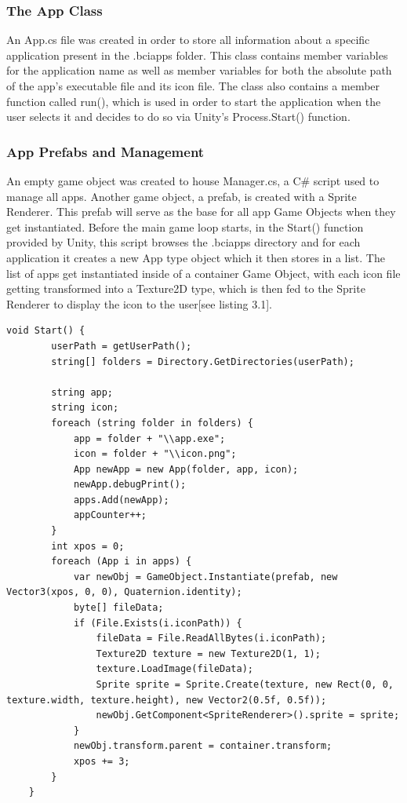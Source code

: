 \subsubsection{The App Class}
An App.cs file was created in order to store all information about a specific application present in the .bciapps folder. This class contains member variables for the application name as well as member variables for both the absolute path of the app's executable file and its icon file. The class also contains a member function called run(), which is used in order to start the application when the user selects it and decides to do so via Unity's Process.Start() function.
\subsubsection{App Prefabs and Management}
An empty game object was created to house Manager.cs, a C\# script used to manage all apps. Another game object, a prefab, is created with a Sprite Renderer. This prefab will serve as the base for all app Game Objects when they get instantiated. 
\vspace{\baselineskip}\newline
Before the main game loop starts, in the Start() function provided by Unity, this script browses the .bciapps directory and for each application it creates a new App type object which it then stores in a list. The list of apps get instantiated inside of a container Game Object, with each icon file getting transformed into a Texture2D type, which is then fed to the Sprite Renderer to display the icon to the user[see listing 3.1].

\begin{lstlisting}[language={[Sharp]C}, caption={Manager.cs initialisation}, label={Script}]
    void Start() {
        userPath = getUserPath();
        string[] folders = Directory.GetDirectories(userPath);

        string app;
        string icon;
        foreach (string folder in folders) {
            app = folder + "\\app.exe";
            icon = folder + "\\icon.png";
            App newApp = new App(folder, app, icon);
            newApp.debugPrint();
            apps.Add(newApp);
            appCounter++;
        }
        int xpos = 0;
        foreach (App i in apps) {
            var newObj = GameObject.Instantiate(prefab, new Vector3(xpos, 0, 0), Quaternion.identity);
            byte[] fileData;
            if (File.Exists(i.iconPath)) {
                fileData = File.ReadAllBytes(i.iconPath);
                Texture2D texture = new Texture2D(1, 1);
                texture.LoadImage(fileData);
                Sprite sprite = Sprite.Create(texture, new Rect(0, 0, texture.width, texture.height), new Vector2(0.5f, 0.5f));
                newObj.GetComponent<SpriteRenderer>().sprite = sprite;
            }
            newObj.transform.parent = container.transform;
            xpos += 3;
        }
    }
\end{lstlisting}

